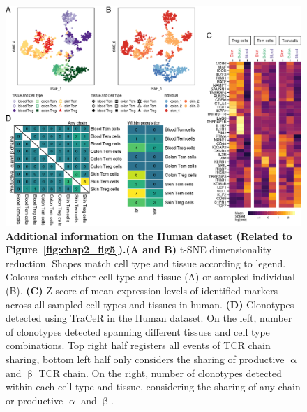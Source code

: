 \begin{figure}[hpt!]
\end{figure}

\begin{figure}[pt!] 
\centering    
\includegraphics[width=1.0\textwidth]{Appendix1/Figs/appA_fig6.png} %
\caption[Additional information about the Human Smart-seq2 dataset]{\textbf{Additional information on the Human dataset (Related to Figure~\ref{fig:chap2_fig5}).}\newline\textbf{(A and B)} t-SNE dimensionality reduction. Shapes match cell type and tissue according to legend. Colours match either cell type and tissue (A) or sampled individual (B). \textbf{(C)} Z-score of mean expression levels of identified markers across all sampled cell types and tissues in human. \textbf{(D)} Clonotypes detected using TraCeR in the Human dataset. On the left, number of clonotypes detected spanning different tissues and cell type combinations. Top right half registers all events of TCR chain sharing, bottom left half only considers the sharing of productive ${\upalpha}$ and ${\upbeta}$ TCR chain. On the right, number of clonotypes detected within each cell type and tissue, considering the sharing of any chain or productive ${\upalpha}$ and ${\upbeta}$.}
\label{fig:appA_fig6}
\end{figure}


